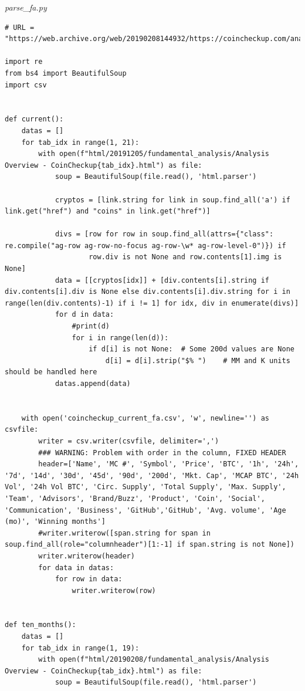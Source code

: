 \documentclass[11pt, english, letterpaper]{article}
\begin{document}
\newpage
\emph{parse\_fa.py}
\begin{lstlisting}
# URL = "https://web.archive.org/web/20190208144932/https://coincheckup.com/analysis"

import re
from bs4 import BeautifulSoup
import csv


def current():
    datas = []
    for tab_idx in range(1, 21):
        with open(f"html/20191205/fundamental_analysis/Analysis Overview - CoinCheckup{tab_idx}.html") as file:
            soup = BeautifulSoup(file.read(), 'html.parser')

            cryptos = [link.string for link in soup.find_all('a') if link.get("href") and "coins" in link.get("href")]

            divs = [row for row in soup.find_all(attrs={"class": re.compile("ag-row ag-row-no-focus ag-row-\w* ag-row-level-0")}) if
                    row.div is not None and row.contents[1].img is None]
            data = [[cryptos[idx]] + [div.contents[i].string if div.contents[i].div is None else div.contents[i].div.string for i in range(len(div.contents)-1) if i != 1] for idx, div in enumerate(divs)]
            for d in data:
                #print(d)
                for i in range(len(d)):
                    if d[i] is not None:  # Some 200d values are None
                        d[i] = d[i].strip("$% ")    # MM and K units should be handled here
            datas.append(data)


    with open('coincheckup_current_fa.csv', 'w', newline='') as csvfile:
        writer = csv.writer(csvfile, delimiter=',')
        ### WARNING: Problem with order in the column, FIXED HEADER
        header=['Name', 'MC #', 'Symbol', 'Price', 'BTC', '1h', '24h', '7d', '14d', '30d', '45d', '90d', '200d', 'Mkt. Cap', 'MCAP BTC', '24h Vol', '24h Vol BTC', 'Circ. Supply', 'Total Supply', 'Max. Supply', 'Team', 'Advisors', 'Brand/Buzz', 'Product', 'Coin', 'Social', 'Communication', 'Business', 'GitHub','GitHub', 'Avg. volume', 'Age (mo)', 'Winning months']
        #writer.writerow([span.string for span in soup.find_all(role="columnheader")[1:-1] if span.string is not None])
        writer.writerow(header)
        for data in datas:
            for row in data:
                writer.writerow(row)


def ten_months():
    datas = []
    for tab_idx in range(1, 19):
        with open(f"html/20190208/fundamental_analysis/Analysis Overview - CoinCheckup{tab_idx}.html") as file:
            soup = BeautifulSoup(file.read(), 'html.parser')


\end{lstlisting}
\end{document}
